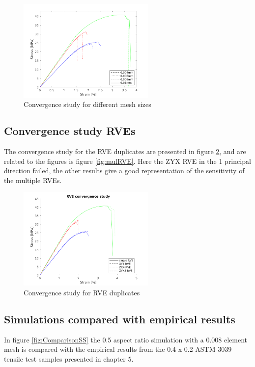 \begin{figure}[H]
    \centering
    \includegraphics[width=0.60\textwidth]{chapter_7_non-elasticmodelling/figures/meshconv.png}
    \caption{Convergence study for different mesh sizes}
    \label{fig:meshconv}
\end{figure}

\subsection{Convergence study RVEs}
The convergence study for the RVE duplicates are presented in figure \ref{fig:RVEgraph}, and are related to the figures is figure \ref{fig:mulRVE}. Here the ZYX RVE in the 1 principal direction failed, the other results give a good representation of the sensitivity of the multiple RVEs. 

\begin{figure}[H]
    \centering
    \includegraphics[width=0.60\textwidth]{chapter_7_non-elasticmodelling/figures/RVEconv.png}
    \caption{Convergence study for RVE duplicates}
    \label{fig:RVEgraph}
\end{figure}

\subsection{Simulations compared with empirical results }
In figure \ref{fig:ComparisonSS} the 0.5 aspect ratio simulation with a 0.008 element mesh is compared with the empirical results from the 0.4 x 0.2 ASTM 3039 tensile test samples presented in chapter 5. 

